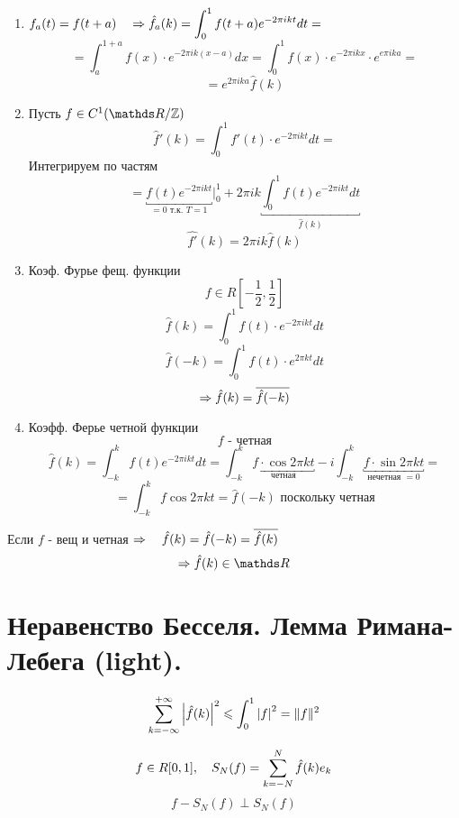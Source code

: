 \documentclass[matan, 12pt, fleqn]{subfiles}
\begin{document}
\begin{properties}
    \begin{enumerate}
        \item $\displaystyle f_a(t) = f(t + a) \quad \Rightarrow \hat{f}_a(k) =
            \int_0^1 f(t + a)e ^{- 2\pi i kt}dt = $
            \[= \int_a^{1 + a} f(x) \cdot e^{-2\pi i k (x - a)} dx = 
            \int_0^1 f(x)\cdot e^{-2\pi i k x} \cdot e^{e\pi i k a} = \]
            \[= e^{2\pi i k a } \hat{f}(k) \]
        \item Пусть $f \in C^{1} (\R / \Z) $
            \[\hat{f}'(k) = \int_0^1 f'(t) \cdot e^{-2\pi i kt} dt =  \]
            Интегрируем по частям
            \[= \underbracket{ f(t)e^{-2\pi i kt}}_{= 0 \text{ т.к. } T = 1}
                \bigg|_0^1  + 2\pi i k 
            \underbracket{\int_0^1 f(t) 
        e^{-2\pi i k t}dt}_{\hat{f}(k)}  \]
        \[\hat{f'}(k) = 2\pi ik \hat{f}(k)\]
        \item Коэф. Фурье фещ. функции
            \[f \in R[-\frac{1}{2}, \frac{1}{2}]\]
            \[\hat{f}(k) = \int_0^1 f(t) \cdot e^{-2 \pi ikt}dt \]
            \[\hat{f}(-k) = \int_0^1 f(t) \cdot e^{2 \pi k t}dt \]
            \[\Rightarrow \hat{f}(k) = \overline{\hat{f}(-k)}\]
        \item Коэфф. Ферье четной функции
            \[f \text{ - четная}\]
            \[\hat{f}(k) = \int_{-k}^k f(t)e^{-2\pi ikt}dt = \int_{-k}^k 
                \underbracket{f \cdot \cos 2\pi k t}_{\text{четная}} 
            - i \int_{-k}^k \underbracket{f \cdot \sin 2\pi kt}_{\text{нечетная } = 0} = \]
            \[= \int_{-k}^k f \cos 2\pi kt = \hat{f}(-k) \text{ поскольку четная} \]
    \end{enumerate}
    Если $f$ - вещ и четная $\Rightarrow \quad \hat{f}(k) = \hat{f}(-k) = \overline{\hat{f}(k)}$
    \[\Ra \hat{f}(k) \in \R\]
\end{properties}


\newpage
\section{Неравенство Бесселя. Лемма Римана-Лебега (light).}

\begin{Definition} 
    \[\sum_{k = -\infty}^{+\infty} \left|\hat{f}(k)\right|^2 \leqslant \int_0^1 \left|f\right|^2 = 
    \lVert f \rVert^2\]
\end{Definition}

\begin{Lemma}
    \[f \in R[0, 1], \quad S_N(f) = \sum_{k = -N}^N \hat{f}(k)e_k \]
    \[f - S_N(f) \perp S_N(f)\]
\end{Lemma}
\end{document}
